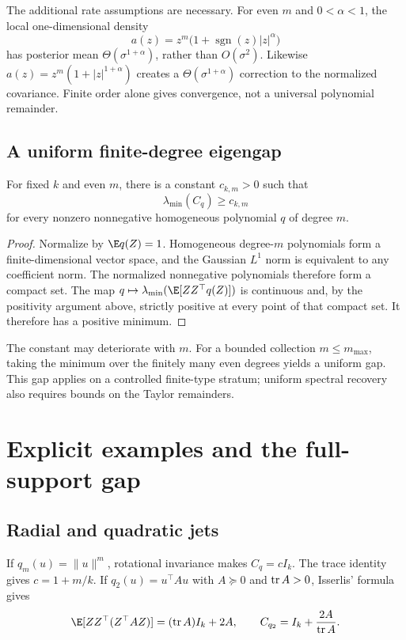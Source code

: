 The additional rate assumptions are necessary.  For even $m$ and $0<\alpha<1$, the local one-dimensional density
\[
  a(z)=z^m\bigl(1+\operatorname{sgn}(z)|z|^\alpha\bigr)
\]
has posterior mean $\Theta(\sigma^{1+\alpha})$, rather than $O(\sigma^2)$.  Likewise
$a(z)=z^m(1+|z|^{1+\alpha})$ creates a
$\Theta(\sigma^{1+\alpha})$ correction to the normalized covariance.  Finite order alone gives convergence, not a universal polynomial remainder.

\subsection{A uniform finite-degree eigengap}

\begin{lemma}
\label{lem:universal-gap}
For fixed $k$ and even $m$, there is a constant $c_{k,m}>0$ such that
\[
  \lambda_{\min}(C_q)\ge c_{k,m}
\]
for every nonzero nonnegative homogeneous polynomial $q$ of degree $m$.
\end{lemma}

\begin{proof}
Normalize by $\E q(Z)=1$.  Homogeneous degree-$m$ polynomials form a finite-dimensional vector space, and the Gaussian $L^1$ norm is equivalent to any coefficient norm.  The normalized nonnegative polynomials therefore form a compact set.  The map
$q\mapsto\lambda_{\min}(\E[ZZ^\top q(Z)])$ is continuous and, by the positivity argument above, strictly positive at every point of that compact set.  It therefore has a positive minimum.
\end{proof}

The constant may deteriorate with $m$.  For a bounded collection
$m\le m_{\max}$, taking the minimum over the finitely many even degrees yields a uniform gap.  This gap applies on a controlled finite-type stratum; uniform spectral recovery also requires bounds on the Taylor remainders.

\section{Explicit examples and the full-support gap}
\label{app:examples}

\subsection{Radial and quadratic jets}

If $q_m(u)=\|u\|^m$, rotational invariance makes $C_q=cI_k$.  The trace identity gives $c=1+m/k$.  If
$q_2(u)=u^\top Au$ with $A\succeq0$ and $\operatorname{tr} A>0$, Isserlis' formula gives
\[
  \E[ZZ^\top(Z^\top AZ)]=(\tr A)I_k+2A,
  \qquad
  C_{q_2}=I_k+\frac{2A}{\tr A}.
\]

